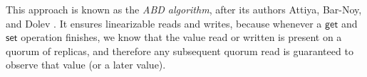 This approach is known as the \emph{ABD algorithm}, after its authors Attiya, Bar-Noy, and Dolev \citep{Attiya:1995}.
It ensures linearizable reads and writes, because whenever a $\mathsf{get}$ and $\mathsf{set}$ operation finishes, we know that the value read or written is present on a quorum of replicas, and therefore any subsequent quorum read is guaranteed to observe that value (or a later value).

